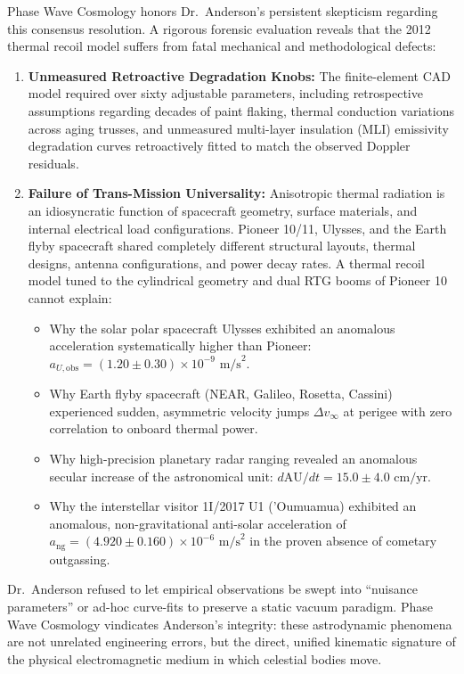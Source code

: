 \documentclass[11pt,a4paper]{article}
\begin{document}
Phase Wave Cosmology honors Dr.~Anderson's persistent skepticism regarding this consensus resolution. A rigorous forensic evaluation reveals that the 2012 thermal recoil model suffers from fatal mechanical and methodological defects:
\begin{enumerate}
    \item \textbf{Unmeasured Retroactive Degradation Knobs:} The finite-element CAD model required over sixty adjustable parameters, including retrospective assumptions regarding decades of paint flaking, thermal conduction variations across aging trusses, and unmeasured multi-layer insulation (MLI) emissivity degradation curves retroactively fitted to match the observed Doppler residuals.
    \item \textbf{Failure of Trans-Mission Universality:} Anisotropic thermal radiation is an idiosyncratic function of spacecraft geometry, surface materials, and internal electrical load configurations. Pioneer 10/11, Ulysses, and the Earth flyby spacecraft shared completely different structural layouts, thermal designs, antenna configurations, and power decay rates. A thermal recoil model tuned to the cylindrical geometry and dual RTG booms of Pioneer 10 cannot explain:
    \begin{itemize}
        \item Why the solar polar spacecraft Ulysses exhibited an anomalous acceleration systematically higher than Pioneer: $a_{U,\text{obs}} = (1.20 \pm 0.30) \times 10^{-9}\text{ m/s}^2$.
        \item Why Earth flyby spacecraft (NEAR, Galileo, Rosetta, Cassini) experienced sudden, asymmetric velocity jumps $\Delta v_\infty$ at perigee with zero correlation to onboard thermal power.
        \item Why high-precision planetary radar ranging revealed an anomalous secular increase of the astronomical unit: $d\text{AU}/dt = 15.0 \pm 4.0\text{ cm/yr}$.
        \item Why the interstellar visitor 1I/2017 U1 ('Oumuamua) exhibited an anomalous, non-gravitational anti-solar acceleration of $a_{\text{ng}} = (4.920 \pm 0.160) \times 10^{-6}\text{ m/s}^2$ in the proven absence of cometary outgassing.
    \end{itemize}
\end{enumerate}

Dr.~Anderson refused to let empirical observations be swept into ``nuisance parameters'' or ad-hoc curve-fits to preserve a static vacuum paradigm. Phase Wave Cosmology vindicates Anderson's integrity: these astrodynamic phenomena are not unrelated engineering errors, but the direct, unified kinematic signature of the physical electromagnetic medium in which celestial bodies move.
\end{document}
